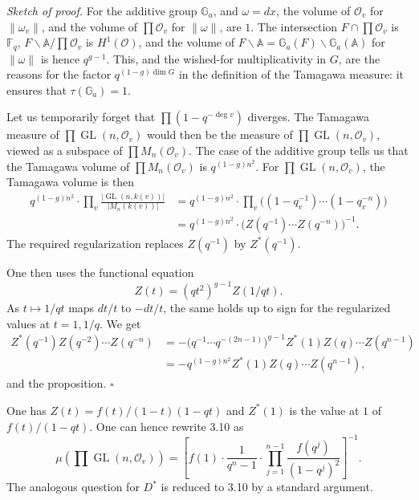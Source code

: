 \documentclass[10pt]{article}
\newcommand{\Fq}{\mathbb F_q}
\newcommand{\Adele}{\mathbb A}
\newcommand{\GL}{\operatorname{GL}}
\newcommand{\degm}{\operatorname{deg}}
\newcommand{\OO}{\mathcal O}
\theoremstyle{deligne}
\newenvironment{sketchproof}[1][Sketch of proof.]{\textit{#1}}{\hfill$\square$}
\begin{document}
\begin{sketchproof}
For the additive group $\mathbb G_a$, and $\omega=dx$, the volume of $\OO_v$ for $\|\omega_v\|$, and the volume of $\prod\OO_v$ for $\|\omega\|$, are $1$. The intersection $F\cap\prod\OO_v$ is $\Fq$, $F\backslash\Adele/\prod\OO_v$ is $H^1(\OO)$, and the volume of $F\backslash\Adele=\mathbb G_a(F)\backslash\mathbb G_a(\Adele)$ for $\|\omega\|$ is hence $q^{g-1}$. This, and the wished-for multiplicativity in $G$, are the reasons for the factor $q^{(1-g)\dim G}$ in the definition of the Tamagawa measure: it ensures that $\tau(\mathbb G_a)=1$.

Let us temporarily forget that $\prod(1-q^{-\degm v})$ diverges. The Tamagawa measure of $\prod\GL(n,\OO_v)$ would then be the measure of $\prod\GL(n,\OO_v)$, viewed as a subspace of $\prod M_n(\OO_v)$. The case of the additive group tells us that the Tamagawa volume of $\prod M_n(\OO_v)$ is $q^{(1-g)n^2}$. For $\prod\GL(n,\OO_v)$, the Tamagawa volume is then
\begin{align*}
q^{(1-g)n^2}\cdot\prod_v\frac{|\GL(n,k(v))|}{|M_n(k(v))|}
&=q^{(1-g)n^2}\cdot\prod_v\bigl((1-q_v^{-1})\cdots(1-q_v^{-n})\bigr)\\
&=q^{(1-g)n^2}\cdot\bigl(Z(q^{-1})\cdots Z(q^{-n})\bigr)^{-1}.
\end{align*}
The required regularization replaces $Z(q^{-1})$ by $Z^*(q^{-1})$.

One then uses the functional equation
\[
Z(t)=(qt^2)^{g-1}Z(1/qt).
\]
As $t\mapsto1/qt$ maps $dt/t$ to $-dt/t$, the same holds up to sign for the regularized values at $t=1,1/q$. We get
\begin{align*}
Z^*(q^{-1})Z(q^{-2})\cdots Z(q^{-n})
&=-\bigl(q^{-1}\cdots q^{-(2n-1)}\bigr)^{g-1}Z^*(1)Z(q)\cdots Z(q^{n-1})\\
&=-q^{(1-g)n^2}Z^*(1)Z(q)\cdots Z(q^{n-1}),
\end{align*}
and the proposition.
\end{sketchproof}

One has $Z(t)=f(t)/(1-t)(1-qt)$ and $Z^*(1)$ is the value at $1$ of $f(t)/(1-qt)$. One can hence rewrite 3.10 as
\begin{equation}\tag{3.10.1}
\mu\left(\prod\GL(n,\OO_v)\right)=
\left[f(1)\cdot\frac{1}{q^n-1}\cdot\prod_{j=1}^{n-1}\frac{f(q^j)}{(1-q^j)^2}\right]^{-1}.
\end{equation}
The analogous question for $D^*$ is reduced to 3.10 by a standard argument.
\end{document}
